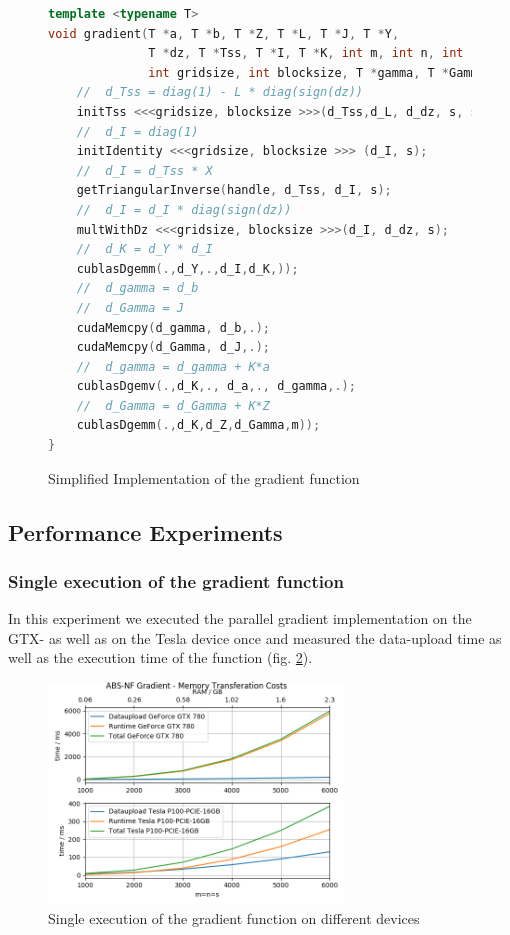\begin{figure}
\begin{lstlisting}[language=cpp]
template <typename T>
void gradient(T *a, T *b, T *Z, T *L, T *J, T *Y,
			  T *dz, T *Tss, T *I, T *K, int m, int n, int s,
			  int gridsize, int blocksize, T *gamma, T *Gamma)
	//  d_Tss = diag(1) - L * diag(sign(dz))
	initTss <<<gridsize, blocksize >>>(d_Tss,d_L, d_dz, s, s*s);
	//  d_I = diag(1)
	initIdentity <<<gridsize, blocksize >>> (d_I, s);
	//  d_I = d_Tss * X	
	getTriangularInverse(handle, d_Tss, d_I, s);
	//	d_I = d_I * diag(sign(dz))
	multWithDz <<<gridsize, blocksize >>>(d_I, d_dz, s);
	//	d_K = d_Y * d_I
	cublasDgemm(.,d_Y,.,d_I,d_K,));
	//	d_gamma = d_b
	//  d_Gamma = J
	cudaMemcpy(d_gamma, d_b,.);
	cudaMemcpy(d_Gamma, d_J,.);
	//	d_gamma = d_gamma + K*a
	cublasDgemv(.,d_K,., d_a,., d_gamma,.);
	//  d_Gamma = d_Gamma + K*Z
	cublasDgemm(.,d_K,d_Z,d_Gamma,m));
}
\end{lstlisting}
\caption{Simplified Implementation of the gradient function \label{fig_lst_grad}}
\end{figure}

\subsection{Performance Experiments}
\subsubsection{Single execution of the gradient function}
In this experiment we executed the parallel gradient implementation on the GTX- as well as on the Tesla device once and measured the data-upload time as well as the execution time of the function (fig. \ref{fig_grad_memory}).
\begin{figure}[ht]
	\centering
	\includegraphics[width=0.7\textwidth]{img/gradient_memory.png}
	\caption{Single execution of the gradient function on different devices}
	\label{fig_grad_memory}
\end{figure}
